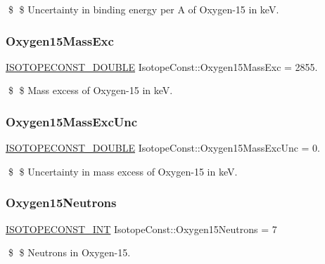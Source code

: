 \$ \$ Uncertainty in binding energy per A of Oxygen-\/15 in keV. \mbox{\label{group___isotope_const-_oxygen-_o15_gaf4aa1155749c6478d37f9bfaa1a3957e}} 
\subsubsection{\texorpdfstring{Oxygen15\+Mass\+Exc}{Oxygen15MassExc}}
{\footnotesize\ttfamily \mbox{\hyperlink{group___isotope_const-_macros_ga8f45a7272ce02c0b4c65c44636ed719a}{I\+S\+O\+T\+O\+P\+E\+C\+O\+N\+S\+T\+\_\+\+D\+O\+U\+B\+LE}} Isotope\+Const\+::\+Oxygen15\+Mass\+Exc = 2855.}

\$ \$ Mass excess of Oxygen-\/15 in keV. \mbox{\label{group___isotope_const-_oxygen-_o15_ga9c51a02d67f5d12fb15cd0484b148731}} 
\subsubsection{\texorpdfstring{Oxygen15\+Mass\+Exc\+Unc}{Oxygen15MassExcUnc}}
{\footnotesize\ttfamily \mbox{\hyperlink{group___isotope_const-_macros_ga8f45a7272ce02c0b4c65c44636ed719a}{I\+S\+O\+T\+O\+P\+E\+C\+O\+N\+S\+T\+\_\+\+D\+O\+U\+B\+LE}} Isotope\+Const\+::\+Oxygen15\+Mass\+Exc\+Unc = 0.}

\$ \$ Uncertainty in mass excess of Oxygen-\/15 in keV. \mbox{\label{group___isotope_const-_oxygen-_o15_ga9b186c3dd37609a0deebb14237d50cfd}} 
\subsubsection{\texorpdfstring{Oxygen15\+Neutrons}{Oxygen15Neutrons}}
{\footnotesize\ttfamily \mbox{\hyperlink{group___isotope_const-_macros_ga5f18360b3e99483a35c32d789e62621c}{I\+S\+O\+T\+O\+P\+E\+C\+O\+N\+S\+T\+\_\+\+I\+NT}} Isotope\+Const\+::\+Oxygen15\+Neutrons = 7}

\$ \$ Neutrons in Oxygen-\/15. \mbox{\label{group___isotope_const-_oxygen-_o15_ga9efab98a324506ed2d1f80d1b0639cdb}} 
